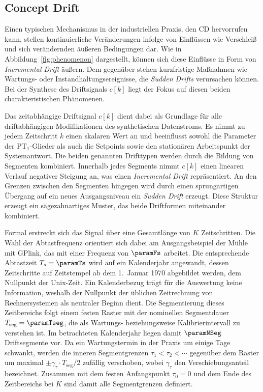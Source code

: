 \subsection{Concept Drift} \label{sec:syn_drift}
%
Einen typischen Mechanismus in der industriellen Praxis, den \ac{CD} hervorrufen kann, stellen kontinuierliche Veränderungen infolge von Einflüssen wie Verschleiß und sich verändernden äußeren Bedingungen dar. Wie in Abbildung~\ref{fig:phenomenon} dargestellt, können sich diese Einflüsse in Form von \emph{Incremental Drift} äußern. Dem gegenüber stehen kurzfristige Maßnahmen wie Wartungs- oder Instandhaltungsereignisse, die \emph{Sudden Drifts} verursachen können. Bei der Synthese des Driftsignals $c[k]$ liegt der Fokus auf diesen beiden charakteristischen Phänomenen. \par
%
Das zeitabhängige Driftsignal $c[k]$ dient dabei als Grundlage für alle driftabhängigen Modifikationen des synthetischen Datenstroms. Es nimmt zu jedem Zeitschritt $k$ einen skalaren Wert an und beeinflusst sowohl die Parameter der $\mathrm{PT}_1$-Glieder als auch die Setpoints sowie den stationären Arbeitspunkt der Systemantwort. Die beiden genannten Drifttypen werden durch die Bildung von Segmenten kombiniert. Innerhalb jedes Segments nimmt $c[k]$ einen linearen Verlauf negativer Steigung an, was einen \emph{Incremental Drift} repräsentiert. An den Grenzen zwischen den Segmenten hingegen wird durch einen sprungartigen Übergang auf ein neues Ausgangsniveau ein \emph{Sudden Drift} erzeugt. Diese Struktur erzeugt ein sägezahnartiges Muster, das beide Driftformen miteinander kombiniert. \par
%
Formal erstreckt sich das Signal über eine Gesamtlänge von $K$ Zeitschritten. Die Wahl der Abtastfrequenz orientiert sich dabei am Ausgangsbeispiel der Mühle mit GPlink, das mit einer Frequenz von $\paramFs$ arbeitet. Die entsprechende Abtastzeit $T_s = \paramTs$ wird auf ein Kalenderjahr angewandt, dessen Zeitschritte auf Zeitstempel ab dem 1.~Januar 1970 abgebildet werden, dem Nullpunkt der Unix-Zeit. Ein Kalenderbezug trägt für die Auswertung keine Information, weshalb der Nullpunkt der üblichen Zeitrechnung von Rechnersystemen als neutraler Beginn dient. Die Segmentierung dieses Zeitbereichs folgt einem festen Raster mit der nominellen Segmentdauer $T_{\mathrm{seg}} = \paramTseg$, die als Wartungs- beziehungsweise Kalibrierintervall zu verstehen ist. Im betrachteten Kalenderjahr liegen damit $\paramNSeg$ Driftsegmente vor. Da ein Wartungstermin in der Praxis um einige Tage schwankt, werden die inneren Segmentgrenzen $\tau_1 < \tau_2 < \cdots$ gegenüber dem Raster um maximal $\pm \gamma_{\tau} \cdot T_{\mathrm{seg}}/2$ zufällig verschoben, wobei $\gamma_{\tau}$ den Verschiebungsanteil bezeichnet. Zusammen mit dem festen Anfangspunkt $\tau_0 = 0$ und dem Ende des Zeitbereichs bei $K$ sind damit alle Segmentgrenzen definiert. \par
